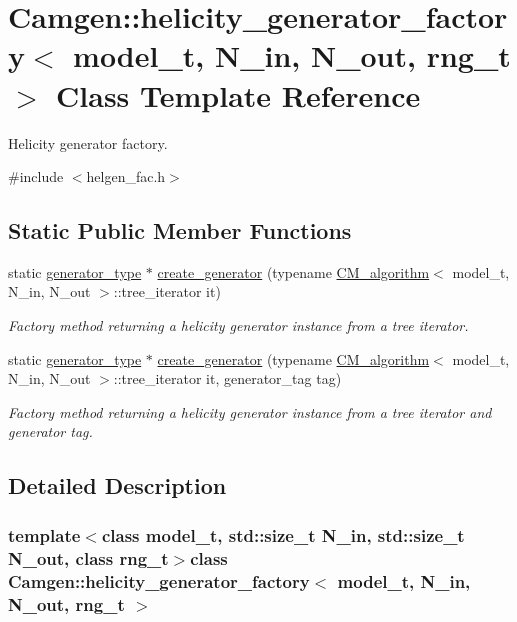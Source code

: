 \hypertarget{a00273}{}\section{Camgen\+:\+:helicity\+\_\+generator\+\_\+factory$<$ model\+\_\+t, N\+\_\+in, N\+\_\+out, rng\+\_\+t $>$ Class Template Reference}
\label{a00273}


Helicity generator factory.  




{\ttfamily \#include $<$helgen\+\_\+fac.\+h$>$}

\subsection*{Static Public Member Functions}
\begin{DoxyCompactItemize}
\item 
static \hyperlink{a00270}{generator\+\_\+type} $\ast$ \hyperlink{a00273_a9b802d69211d42fd9123a78c11b4b1c1}{create\+\_\+generator} (typename \hyperlink{a00065}{C\+M\+\_\+algorithm}$<$ model\+\_\+t, N\+\_\+in, N\+\_\+out $>$\+::tree\+\_\+iterator it)
\begin{DoxyCompactList}\small\item\em Factory method returning a helicity generator instance from a tree iterator. \end{DoxyCompactList}\item 
static \hyperlink{a00270}{generator\+\_\+type} $\ast$ \hyperlink{a00273_a21a83d1a6e3d2edcfbac1533ee54ad5e}{create\+\_\+generator} (typename \hyperlink{a00065}{C\+M\+\_\+algorithm}$<$ model\+\_\+t, N\+\_\+in, N\+\_\+out $>$\+::tree\+\_\+iterator it, generator\+\_\+tag tag)
\begin{DoxyCompactList}\small\item\em Factory method returning a helicity generator instance from a tree iterator and generator tag. \end{DoxyCompactList}\end{DoxyCompactItemize}


\subsection{Detailed Description}
\subsubsection*{template$<$class model\+\_\+t, std\+::size\+\_\+t N\+\_\+in, std\+::size\+\_\+t N\+\_\+out, class rng\+\_\+t$>$class Camgen\+::helicity\+\_\+generator\+\_\+factory$<$ model\+\_\+t, N\+\_\+in, N\+\_\+out, rng\+\_\+t $>$}

